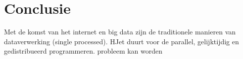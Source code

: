 \documentclass[twoside,twocolumn]{article}
\begin{document}
\section{Conclusie}
Met de komst van het internet en big data zijn de traditionele manieren van
dataverwerking (single processed). HJet duurt voor de 
parallel, gelijktijdig en gedistribueerd programmeren.
probleem kan worden 





\clearpage
\onecolumn

\end{document}

